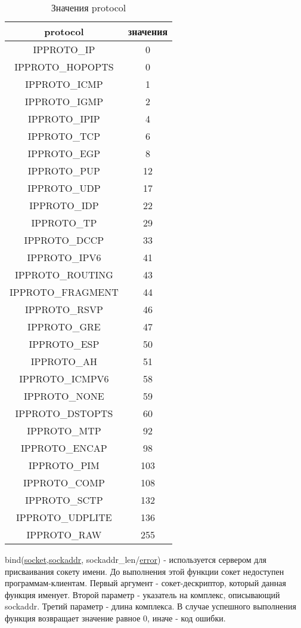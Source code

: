 \documentclass[12t,english,russian]{article}
\begin{document}
\begin{table}[H]
\caption{\label{protocol}Значения protocol}
\begin{center}
\begin{tabular}{|c|c|}
\hline
protocol & значения \\
\hline
IPPROTO\_IP & 0 \\
IPPROTO\_HOPOPTS & 0 \\
IPPROTO\_ICMP & 1 \\
IPPROTO\_IGMP & 2 \\
IPPROTO\_IPIP & 4 \\
IPPROTO\_TCP & 6 \\
IPPROTO\_EGP & 8 \\
IPPROTO\_PUP & 12 \\
IPPROTO\_UDP & 17 \\
IPPROTO\_IDP & 22 \\
IPPROTO\_TP & 29 \\
IPPROTO\_DCCP & 33 \\
IPPROTO\_IPV6 & 41 \\
IPPROTO\_ROUTING & 43 \\
IPPROTO\_FRAGMENT & 44 \\
IPPROTO\_RSVP & 46 \\
IPPROTO\_GRE & 47 \\
IPPROTO\_ESP & 50 \\
IPPROTO\_AH & 51 \\
IPPROTO\_ICMPV6 & 58 \\
IPPROTO\_NONE & 59 \\
IPPROTO\_DSTOPTS & 60 \\
IPPROTO\_MTP & 92 \\
IPPROTO\_ENCAP & 98 \\
IPPROTO\_PIM & 103 \\
IPPROTO\_COMP & 108 \\
IPPROTO\_SCTP & 132 \\
IPPROTO\_UDPLITE & 136 \\
IPPROTO\_RAW & 255 \\
\hline
\end{tabular}
\end{center}
\end{table}

\label{bind}
bind(\hyperref[socket]{socket},\hyperref[sockaddr]{sockaddr}, sockaddr\_len/\hyperref[error]{error}) - используется сервером для присваивания сокету имени. До выполнения этой функции сокет недоступен программам-клиентам. Первый аргумент - сокет-дескриптор, который данная функция именует. Второй параметр - указатель на комплекс, описывающий sockaddr. Третий параметр - длина комплекса. В случае успешного выполнения функция возвращает значение равное 0, иначе - код ошибки.
\end{document}
